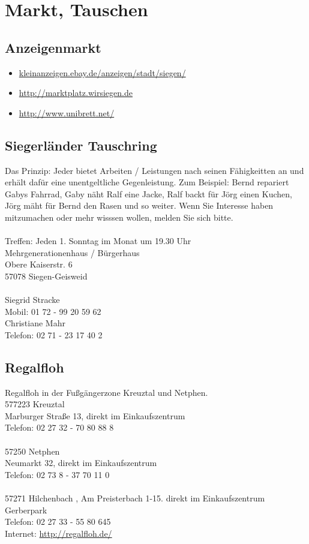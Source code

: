 \chapter{Markt, Tauschen}  

\section{Anzeigenmarkt}
\begin{itemize}
	\item \href{http://kleinanzeigen.ebay.de/anzeigen/stadt/siegen/}{kleinanzeigen.ebay.de/anzeigen/stadt/siegen/}
	\item \href{http://marktplatz.wirsiegen.de/}{http://marktplatz.wirsiegen.de} 
	\item \href{http://www.unibrett.net/}{http://www.unibrett.net/}
\end{itemize}

\section{Siegerländer Tauschring}
Das Prinzip: Jeder bietet Arbeiten / Leistungen nach seinen Fähigkeitten an und erhält dafür eine unentgeltliche Gegenleistung. Zum Beispiel: Bernd repariert Gabys Fahrrad, Gaby näht Ralf eine Jacke, Ralf backt für Jörg einen Kuchen, Jörg mäht für Bernd den Rasen und so weiter. Wenn Sie Interesse haben mitzumachen oder mehr wisssen wollen, melden Sie sich bitte.\\
\\
Treffen: Jeden 1. Sonntag im Monat um 19.30 Uhr\\
Mehrgenerationenhaus / Bürgerhaus\\
Obere Kaiserstr. 6\\
57078 Siegen-Geisweid \\
\\
Siegrid Stracke\\
Mobil: 01 72 - 99 20 59 62 \\
Christiane Mahr\\
Telefon: 02 71 - 23 17 40 2\\

\section{Regalfloh}
Regalfloh in der Fußgängerzone Kreuztal und Netphen.\\
577223 Kreuztal\\
Marburger Straße 13, direkt im Einkaufszentrum\\
Telefon: 02 27 32 - 70 80 88 8 \\
\\
57250 Netphen\\
Neumarkt 32, direkt im Einkaufszentrum\\
Telefon: 02 73 8 - 37 70 11 0 \\
\\
57271 Hilchenbach , Am Preisterbach 1-15. direkt im Einkaufszentrum Gerberpark\\
Telefon: 02 27 33 - 55 80  645\\
Internet: \href{http://regalfloh.de/}{http://regalfloh.de/}   

